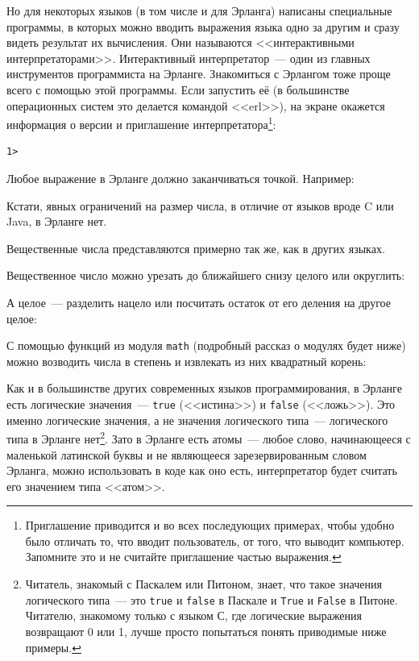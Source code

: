 \documentclass[
  paper=a4,
  fontsize=14pt,
  openany,
  appendixprefix=true
]{scrbook}
\begin{document}
Но для некоторых языков (в том числе и для Эрланга) написаны специальные программы, в которых можно вводить выражения языка одно за другим и сразу видеть результат их вычисления. Они называются <<интерактивными интерпретаторами>>. Интерактивный интерпретатор~--- один из главных инструментов программиста на Эрланге. Знакомиться с Эрлангом тоже проще всего с помощью этой программы. Если запустить её (в большинстве операционных систем это делается командой <<erl>>), на экране окажется информация о версии и приглашение интерпретатора\footnote{Приглашение приводится и во всех последующих примерах, чтобы удобно было отличать то, что вводит пользователь, от того, что выводит компьютер. Запомните это и не считайте приглашение частью выражения.}:
\begin{verbatim}
1>
\end{verbatim}

Любое выражение в Эрланге должно заканчиваться точкой. Например:

Кстати, явных ограничений на размер числа, в отличие от языков вроде C или Java, в Эрланге нет.

Вещественные числа представляются примерно так же, как в других языках.

Вещественное число можно урезать до ближайшего снизу целого или округлить:

А целое~--- разделить нацело или посчитать остаток от его деления на другое целое:

С помощью функций из модуля \lstinline{math} (подробный рассказ о модулях будет ниже) можно возводить числа в степень и извлекать из них квадратный корень:

Как и в большинстве других современных языков программирования, в Эрланге есть логические значения~--- \lstinline{true} (<<истина>>) и \lstinline{false} (<<ложь>>). Это именно логические значения, а не значения логического типа~--- логического типа в Эрланге нет\footnote{Читатель, знакомый с Паскалем или Питоном, знает, что такое значения логического типа~--- это \lstinline{true} и \lstinline{false} в Паскале и \lstinline{True} и \lstinline{False} в Питоне. Читателю, знакомому только с языком С, где логические выражения возвращают 0 или 1, лучше просто попытаться понять приводимые ниже примеры.}. Зато в Эрланге есть атомы~--- любое слово, начинающееся с маленькой латинской буквы и не являющееся зарезервированным словом Эрланга, можно использовать в коде как оно есть, интерпретатор будет считать его значением типа <<атом>>. 
\end{document}
